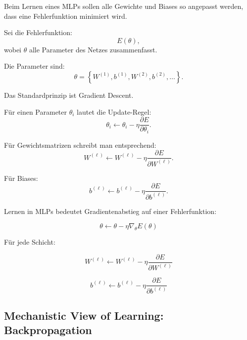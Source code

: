 \documentclass[11pt,a4paper]{scrartcl}
\newcommand{\set}[1]{\left\{ #1 \right\}}
\begin{document}
\begin{notebox}
    Beim Lernen eines MLPs sollen alle Gewichte und Biases so angepasst werden,
    dass eine Fehlerfunktion minimiert wird.

    Sei die Fehlerfunktion:
    \[
        E(\theta),
    \]
    wobei \(\theta\) alle Parameter des Netzes zusammenfasst.

    Die Parameter sind:
    \[
        \theta
        =
        \set{W^{(1)},b^{(1)},W^{(2)},b^{(2)},\dots}.
    \]
\end{notebox}

\begin{solutionbox}
    Das Standardprinzip ist Gradient Descent.

    Für einen Parameter \(\theta_i\) lautet die Update-Regel:
    \[
        \theta_i
        \leftarrow
        \theta_i
        -
        \eta
        \frac{\partial E}{\partial \theta_i}.
    \]

    Für Gewichtsmatrizen schreibt man entsprechend:
    \[
        W^{(\ell)}
        \leftarrow
        W^{(\ell)}
        -
        \eta
        \frac{\partial E}{\partial W^{(\ell)}}.
    \]

    Für Biases:
    \[
        b^{(\ell)}
        \leftarrow
        b^{(\ell)}
        -
        \eta
        \frac{\partial E}{\partial b^{(\ell)}}.
    \]
\end{solutionbox}

\begin{answerbox}
    Lernen in MLPs bedeutet Gradientenabstieg auf einer Fehlerfunktion:

    \[
        \boxed{
            \theta
            \leftarrow
            \theta
            -
            \eta
            \nabla_\theta E(\theta)
        }
    \]

    Für jede Schicht:

    \[
        \boxed{
            W^{(\ell)}
            \leftarrow
            W^{(\ell)}
            -
            \eta
            \frac{\partial E}{\partial W^{(\ell)}}
        }
    \]

    \[
        \boxed{
            b^{(\ell)}
            \leftarrow
            b^{(\ell)}
            -
            \eta
            \frac{\partial E}{\partial b^{(\ell)}}
        }
    \]
\end{answerbox}

\subsection{Mechanistic View of Learning: Backpropagation}
\end{document}

